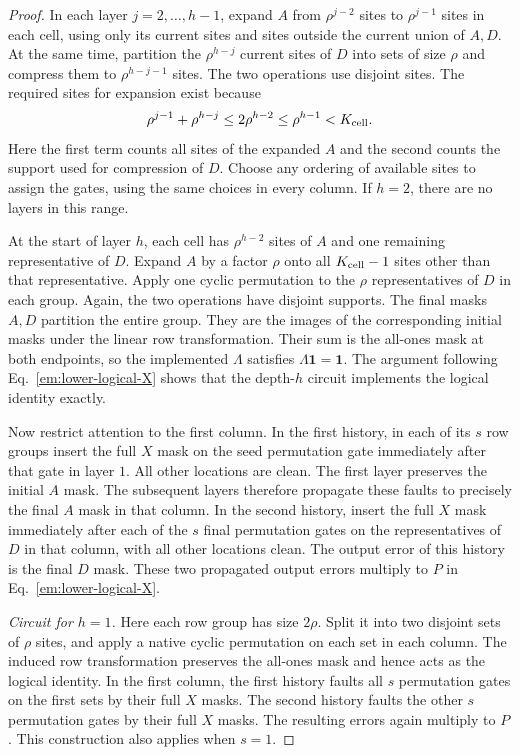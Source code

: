 \documentclass[aps,prl,reprint,notitlepage,nofootinbib,nobibnotes]{revtex4-2}
\begin{document}
\begin{proof}
In each layer $j=2,\ldots,h-1$, expand $A$ from $\rho^{j-2}$ sites to $\rho^{j-1}$ sites in each
cell, using only its current sites and sites outside the current union of $A,D$. At the same time,
partition the $\rho^{h-j}$ current sites of $D$ into sets of size $\rho$ and compress them to
$\rho^{h-j-1}$ sites. The two operations use disjoint sites. The required sites for expansion exist
because
\[
 \rho^{j-1}+\rho^{h-j}
 \le 2\rho^{h-2}\le\rho^{h-1}<K_{\rm cell}.
\]
Here the first term counts all sites of the expanded $A$ and the second counts the support used for
compression of $D$. Choose any ordering of available sites to assign the gates, using the same
choices in every column. If $h=2$, there are no layers in this range.

At the start of layer $h$, each cell has $\rho^{h-2}$ sites of $A$ and one remaining representative
of $D$. Expand $A$ by a factor $\rho$ onto all $K_{\rm cell}-1$ sites other than that
representative. Apply one cyclic permutation to the $\rho$ representatives of $D$ in each group.
Again, the two operations have disjoint supports. The final masks $A,D$ partition the entire group.
They are the images of the corresponding initial masks under the linear row transformation. Their
sum is the all-ones mask at both endpoints, so the implemented $\Lambda$ satisfies $\Lambda\mathbf
1=\mathbf 1$. The argument following Eq.~\eqref{em:lower-logical-X} shows that the depth-$h$
circuit implements the logical identity exactly.

Now restrict attention to the first column. In the first history, in each of its $s$ row groups
insert the full $X$ mask on the seed permutation gate immediately after that gate in layer $1$. All
other locations are clean. The first layer preserves the initial $A$ mask. The subsequent layers
therefore propagate these faults to precisely the final $A$ mask in that column. In the second
history, insert the full $X$ mask immediately after each of the $s$ final permutation gates on the
representatives of $D$ in that column, with all other locations clean. The output error of this
history is the final $D$ mask. These two propagated output errors multiply to $P$ in
Eq.~\eqref{em:lower-logical-X}.

\emph{Circuit for $h=1$.}
Here each row group has size $2\rho$. Split it into two disjoint sets of $\rho$ sites, and apply a
native cyclic permutation on each set in each column. The induced row transformation preserves the
all-ones mask and hence acts as the logical identity. In the first column, the first history faults
all $s$ permutation gates on the first sets by their full $X$ masks. The second history faults the
other $s$ permutation gates by their full $X$ masks. The resulting errors again multiply to $P$.
This construction also applies when $s=1$.


\end{proof}
\end{document}
